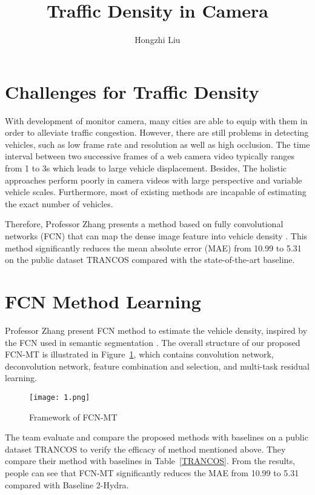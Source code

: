 \documentclass[twocolumn]{article}
\title{Traffic Density in Camera}
\author{Hongzhi Liu}
\begin{document}
\maketitle
\par
\section{Challenges for Traffic Density}
	With development of monitor camera, many cities are able to equip with them in order to alleviate traffic congestion. However, there are still problems in detecting vehicles, such as low frame rate and resolution as well as high occlusion. The time interval between two successive frames of a web camera video typically ranges from 1 to 3s which leads to large vehicle displacement. Besides, The holistic approaches perform poorly in camera videos with large perspective and variable vehicle scales. Furthermore, most of existing methods are incapable of estimating the exact number of vehicles.
	
	Therefore, Professor Zhang presents a method based on fully convolutional networks (FCN) that can map the dense image feature into vehicle density \cite{1}. This method significantly reduces the mean absolute error (MAE) from 10.99 to 5.31 on the public dataset TRANCOS compared with the state-of-the-art baseline.
	
\section{FCN Method Learning}	

    Professor Zhang present FCN method to estimate the vehicle density, inspired by the FCN used in semantic segmentation \cite{2}. The overall structure of our proposed FCN-MT is illustrated in Figure~\ref{fig-FCN}, which contains convolution network, deconvolution network, feature combination and selection, and multi-task residual learning. 

\begin{figure}[htbp]
	\centering
	\texttt{[image: 1.png]}
	\caption{Framework of FCN-MT} \label{fig-FCN}
\end{figure}

    The team evaluate and compare the proposed methods with baselines on a public dataset TRANCOS to verify the efficacy of method mentioned above. They compare their method with baselines in Table~\ref{TRANCOS}. From the results, people can see that FCN-MT significantly reduces the MAE from 10.99 to 5.31 compared with Baseline 2-Hydra.
    
\end{document}
